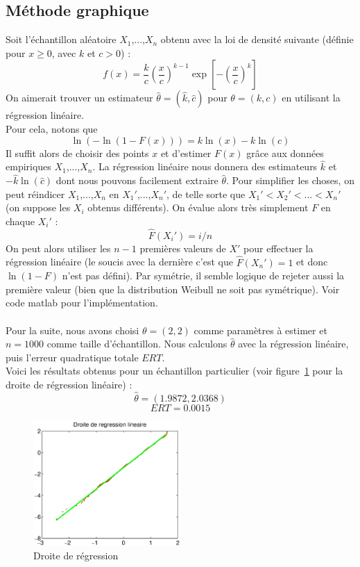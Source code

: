 \subsection{Méthode graphique}
Soit l'échantillon aléatoire $X_1$,...,$X_n$ obtenu avec la loi de densité suivante (définie pour $x \geq 0$, avec $k$ et $c > 0$) :
$$ f(x) = \frac{k}{c}\left(\frac{x}{c}\right)^{k-1}\exp\left[-\left(\frac{x}{c}\right)^{k}\right] $$ 
On aimerait trouver un estimateur $\hat{\theta} = (\hat{k},\hat{c})$ pour $\theta = (k,c)$ en utilisant la régression linéaire.\\
Pour cela, notons que
$$ \ln(-\ln(1-F(x))) = k\ln(x)-k\ln(c) $$
Il suffit alors de choisir des points $x$ et d'estimer $F(x)$ grâce aux données empiriques $X_1$,...,$X_n$. La régression linéaire nous donnera des estimateurs $\hat{k}$ et $-\hat{k}\ln(\hat{c})$ dont nous pouvons facilement extraire $\hat{\theta}$. Pour simplifier les choses, on peut réindicer $X_1$,...,$X_n$ en $X_1'$,...,$X_n'$, de telle sorte que $X_1'<X_2'<$...$<X_n'$ (on suppose les $X_i$ obtenus différents). On évalue alors très simplement $F$ en chaque $X_i'$ : 
$$ \hat{F}(X_i') = i/n $$
On peut alors utiliser les $n-1$ premières valeurs de $X'$ pour effectuer la régression linéaire (le soucis avec la dernière c'est que $\hat{F}(X_n') = 1$ et donc $\ln(1-F)$ n'est pas défini). Par symétrie, il semble logique de rejeter aussi la première valeur (bien que la distribution Weibull ne soit pas symétrique). Voir code matlab pour l'implémentation.
\paragraph{}
Pour la suite, nous avons choisi $\theta = (2,2)$ comme paramètres à estimer et $n =1000$ comme taille d'échantillon.
Nous calculons $\hat{\theta}$ avec la régression linéaire, puis l'erreur quadratique totale $ERT$.\\
Voici les résultats obtenus pour un échantillon particulier (voir figure~\ref{fig:droite} pour la droite de régression linéaire) :
$$ \hat{\theta} = (1.9872,2.0368) $$
$$ ERT  = 0.0015 $$

\begin{figure}[!ht]
        \centering
        \includegraphics[width=0.5\textwidth]{graphes/droite_mg.eps}
        \caption{Droite de régression}\label{fig:droite}
\end{figure}

